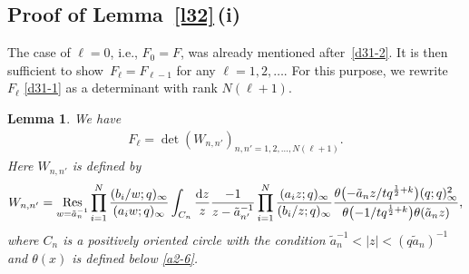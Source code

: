 \documentclass[pdftex]{sigma}
\numberwithin{equation}{section}
\newtheorem{Lemma}[Theorem]{Lemma}
\def\i{\infty}
\begin{document}
\subsection[Proof of Lemma 3.4 (i)]{Proof of Lemma~\ref{l32}\,(i)}
\label{s32}
 The case of $\ell=0$, i.e., $F_0=F$, was already mentioned after~\eqref{d31-2}.
 It is then sufficient to show~${F_{\ell}=F_{\ell-1}}$ for any $\ell=1,2,\dots$.
 For this purpose, we rewrite $F_{\ell}$ \eqref{d31-1} as a determinant with rank $N(\ell+ 1)$.
 \begin{Lemma}
 \label{l34}
 We have
 \begin{align}
 \label{3-12}
 F_{\ell}=\det\left(W_{n,n'}\right)_{n,n'=1,2,\dots,N(\ell+1)}.
 \end{align}
 Here $W_{n,n'}$ is defined by
 \begin{align}
\label{3-17}
 W_{n,n'}
 =
 \underset{w=\tilde{a}_{n}^{-1}}{\mathrm{Res}}
 \prod_{i=1}^N\frac{(b_i/w;q)_{\i}}{(a_i w;q)_{\i}}
 \int_{C_{n}}\frac{{\rm d}z}{z}
 \frac{-1}{z-\tilde{a}_{n'}^{-1}}
 \prod_{i=1}^N\frac{(a_i z;q)_{\i}}{(b_i/z;q)_{\i}}
 \frac{\theta\bigl(-\tilde{a}_{n}z/tq^{\frac12+k}\bigr)(q;q)_{\i}^2}{\theta\bigl(-1/tq^{\frac12+k}\bigr)\theta(\tilde{a}_n z)},
\end{align}
 where $C_n$ is a positively oriented circle with the condition $\tilde{a}_n^{-1}<|z|<(q\tilde{a}_n)^{-1}$ and $\theta(x)$ is defined below \eqref{a2-6}.
 \end{Lemma}
\end{document}
